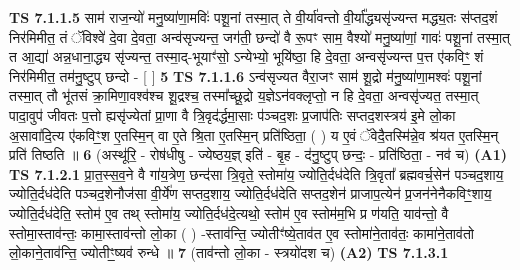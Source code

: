 \documentclass[17pt]{extarticle}
\begin{document}
                  \newline
                                \textbf{ TS 7.1.1.5} \newline
                  साम॑ राज॒न्यो॑ मनु॒ष्या॑णा॒मविः॑ पशू॒नां तस्मा॒त् ते वी॒र्या॑वन्तो वी॒र्या᳚द्ध्यसृ॑ज्यन्त मद्ध्य॒तः स॑प्तद॒शं निर॑मिमीत॒ तं ॅविश्वे॑ दे॒वा दे॒वता॒ अन्व॑सृज्यन्त॒ जग॑ती॒ छन्दो॑ वै रू॒पꣳ साम॒ वैश्यो॑ मनु॒ष्या॑णां॒ गावः॑ पशू॒नां तस्मा॒त् त आ॒द्या॑ अन्न॒धाना॒द्ध्य सृ॑ज्यन्त॒ तस्मा॒द्-भूयाꣳ॑सो॒ ऽन्येभ्यो॒ भूयि॑ष्ठा॒ हि दे॒वता॒ अन्वसृ॑ज्यन्त प॒त्त ए॑कविꣳ॒॒ शं निर॑मिमीत॒ तम॑नु॒ष्टुप् छन्दो - [  ] \textbf{  5} \newline
                  \newline
                                \textbf{ TS 7.1.1.6} \newline
                  ऽन्व॑सृज्यत वैरा॒जꣳ साम॑ शू॒द्रो म॑नु॒ष्या॑णा॒मश्वः॑ पशू॒नां तस्मा॒त् तौ भू॑तसं क्रा॒मिणा॒वश्व॑श्च शू॒द्रश्च॒ तस्मा᳚च्छू॒द्रो य॒ज्ञेऽन॑वक्लृप्तो॒ न हि दे॒वता॒ अन्वसृ॑ज्यत॒ तस्मा॒त् पादा॒वुप॑ जीवतः प॒त्तो ह्यसृ॑ज्येतां प्रा॒णा वै त्रि॒वृद॑र्द्धमा॒साः प॑ञ्चद॒शः प्र॒जाप॑तिः सप्तद॒शस्त्रय॑ इ॒मे लो॒का अ॒सावा॑दि॒त्य ए॑कविꣳ॒॒श ए॒तस्मि॒न् वा ए॒ते श्रि॒ता ए॒तस्मि॒न् प्रति॑ष्ठिता॒ ( ) य ए॒वं ॅवेदै॒तस्मि॑न्ने॒व श्र॑यत ए॒तस्मि॒न् प्रति॑ तिष्ठति ॥ \textbf{  6} \newline
                  \newline
                      (अस्थू॑रि॒ - रोष॑धीषु - ज्येष्ठय॒ज्ञ् इति॑ - बृ॒ह - द॑नु॒ष्टुप् छन्दः॒ - प्रति॑ष्ठिता॒ - नव॑ च)  \textbf{(A1)} \newline \newline
                                        \textbf{ TS 7.1.2.1} \newline
                  प्रा॒त॒स्स॒व॒ने वै गा॑य॒त्रेण॒ छन्द॑सा त्रि॒वृते॒ स्तोमा॑य॒ ज्योति॒र्दध॑देति त्रि॒वृता᳚ ब्रह्मवर्च॒सेन॑ पञ्चद॒शाय॒ ज्योति॒र्दध॑देति पञ्चद॒शेनौज॑सा वी॒र्ये॑ण सप्तद॒शाय॒ ज्योति॒र्दध॑देति सप्तद॒शेन॑ प्राजाप॒त्येन॑ प्र॒जन॑नेनैकविꣳ॒॒शाय॒ ज्योति॒र्दध॑देति॒ स्तोम॑ ए॒व तथ् स्तोमा॑य॒ ज्योति॒र्दध॑दे॒त्यथो॒ स्तोम॑ ए॒व स्तोम॑म॒भि प्र ण॑यति॒ याव॑न्तो॒ वै स्तोमा॒स्ताव॑न्तः॒ कामा॒स्ताव॑न्तो लो॒का ( ) -स्ताव॑न्ति॒ ज्योतीꣳ॑ष्ये॒ताव॑त ए॒व स्तोमा॑ने॒ताव॑तः॒ कामा॑ने॒ताव॑तो लो॒काने॒ताव॑न्ति॒ ज्योतीꣳ॒॒ष्यव॑ रुन्धे ॥ \textbf{  7} \newline
                  \newline
                      (ताव॑न्तो लो॒का - स्त्रयो॑दश च)  \textbf{(A2)} \newline \newline
                                        \textbf{ TS 7.1.3.1} \newline
\end{document}
